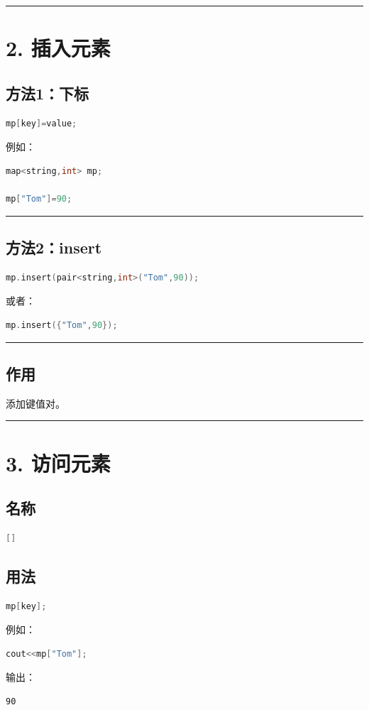 \documentclass[10pt,twocolumn]{extarticle}
\begin{document}
\noindent\rule{\linewidth}{0.4pt}

\section{2. 插入元素}

\subsection{方法1：下标}
\begin{lstlisting}[language=C++]
mp[key]=value;
\end{lstlisting}
例如：
\begin{lstlisting}[language=C++]
map<string,int> mp;

mp["Tom"]=90;
\end{lstlisting}

\noindent\rule{\linewidth}{0.4pt}

\subsection{方法2：insert}
\begin{lstlisting}[language=C++]
mp.insert(pair<string,int>("Tom",90));
\end{lstlisting}
或者：
\begin{lstlisting}[language=C++]
mp.insert({"Tom",90});
\end{lstlisting}

\noindent\rule{\linewidth}{0.4pt}

\subsection{作用}
添加键值对。

\noindent\rule{\linewidth}{0.4pt}

\section{3. 访问元素}

\subsection{名称}
\begin{lstlisting}[language=C++]
[]
\end{lstlisting}

\subsection{用法}
\begin{lstlisting}[language=C++]
mp[key];
\end{lstlisting}
例如：
\begin{lstlisting}[language=C++]
cout<<mp["Tom"];
\end{lstlisting}
输出：
\begin{lstlisting}
90
\end{lstlisting}
\end{document}
